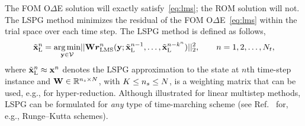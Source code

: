 \documentclass[3p,computermodern,10pt]{elsarticle}
\begin{document}
The FOM O$\Delta$E solution will exactly satisfy~\eqref{eq:lms}; the ROM solution will not. The LSPG method minimizes the residual of the FOM O$\Delta$E~\eqref{eq:lms} within the trial space over each time step. %
The LSPG method is defined as follows,
\begin{equation*}
\tilde{\mathbf{x}}_{\text{L}}^n = \underset{\mathbf{y} \in \mathcal{V }  }{\text{arg\,min}}|| \mathbf{W}\boldsymbol r_{\text{LMS}}^{n} (\mathbf{y}; \tilde{\mathbf{x}}_{\text{L}}^{n-1},\ldots,\tilde{\mathbf{x}}_{\text{L}}^{n-k^n}) ||_2^2, \qquad n = 1,2,\hdots,N_t,
\end{equation*}
where $\tilde{\mathbf{x}}_{\text{L}}^n \approx {\mathbf{x}}^{n}$ denotes the LSPG approximation to the state at $n$th time-step instance and 
$\mathbf{W} \in \mathbb{R}^{n_s \times N}$, with $K \le n_s \le N$, is a weighting matrix that can be used, e.g., for hyper-reduction. 
Although illustrated for linear multistep methods, LSPG can be 
formulated for \textit{any} type of time-marching scheme (see Ref.~\cite{carlberg_lspg_v_galerkin} for, e.g., Runge--Kutta schemes). 
\end{document}
